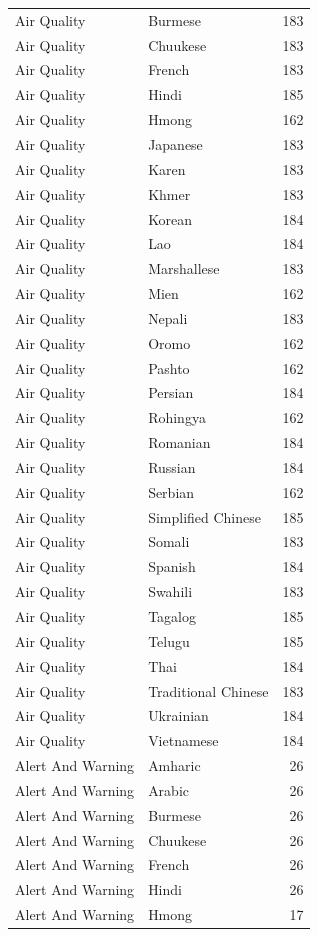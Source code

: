 \begin{longtable}{p{3cm} p{3cm} r}
Air Quality & Burmese & 183 \\
Air Quality & Chuukese & 183 \\
Air Quality & French & 183 \\
Air Quality & Hindi & 185 \\
Air Quality & Hmong & 162 \\
Air Quality & Japanese & 183 \\
Air Quality & Karen & 183 \\
Air Quality & Khmer & 183 \\
Air Quality & Korean & 184 \\
Air Quality & Lao & 184 \\
Air Quality & Marshallese & 183 \\
Air Quality & Mien & 162 \\
Air Quality & Nepali & 183 \\
Air Quality & Oromo & 162 \\
Air Quality & Pashto & 162 \\
Air Quality & Persian & 184 \\
Air Quality & Rohingya & 162 \\
Air Quality & Romanian & 184 \\
Air Quality & Russian & 184 \\
Air Quality & Serbian & 162 \\
Air Quality & Simplified Chinese & 185 \\
Air Quality & Somali & 183 \\
Air Quality & Spanish & 184 \\
Air Quality & Swahili & 183 \\
Air Quality & Tagalog & 185 \\
Air Quality & Telugu & 185 \\
Air Quality & Thai & 184 \\
Air Quality & Traditional Chinese & 183 \\
Air Quality & Ukrainian & 184 \\
Air Quality & Vietnamese & 184 \\
Alert And Warning & Amharic & 26 \\
Alert And Warning & Arabic & 26 \\
Alert And Warning & Burmese & 26 \\
Alert And Warning & Chuukese & 26 \\
Alert And Warning & French & 26 \\
Alert And Warning & Hindi & 26 \\
Alert And Warning & Hmong & 17 \\

\end{longtable}
